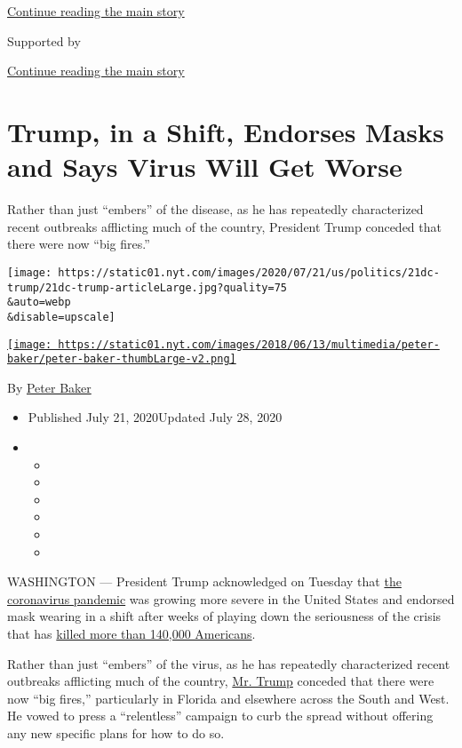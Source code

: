 \protect\hyperlink{after-top}{Continue reading the main story}

Supported by

\protect\hyperlink{after-sponsor}{Continue reading the main story}

\hypertarget{trump-in-a-shift-endorses-masks-and-says-virus-will-get-worse}{%
\section{Trump, in a Shift, Endorses Masks and Says Virus Will Get
Worse}\label{trump-in-a-shift-endorses-masks-and-says-virus-will-get-worse}}

Rather than just ``embers'' of the disease, as he has repeatedly
characterized recent outbreaks afflicting much of the country, President
Trump conceded that there were now ``big fires.''

\texttt{[image: https://static01.nyt.com/images/2020/07/21/us/politics/21dc-trump/21dc-trump-articleLarge.jpg?quality=75\\\&auto=webp\\\&disable=upscale]}

\href{https://www.nytimes.com/by/peter-baker}{\texttt{[image: https://static01.nyt.com/images/2018/06/13/multimedia/peter-baker/peter-baker-thumbLarge-v2.png]}}

By \href{https://www.nytimes.com/by/peter-baker}{Peter Baker}

\begin{itemize}
\item
  Published July 21, 2020Updated July 28, 2020
\item
  \begin{itemize}
  \item
  \item
  \item
  \item
  \item
  \item
  \end{itemize}
\end{itemize}

WASHINGTON --- President Trump acknowledged on Tuesday that
\href{https://www.nytimes.com/2020/07/21/world/coronavirus-covid-19.html}{the
coronavirus pandemic} was growing more severe in the United States and
endorsed mask wearing in a shift after weeks of playing down the
seriousness of the crisis that has
\href{https://www.nytimes.com/interactive/2020/us/coronavirus-us-cases.html}{killed
more than 140,000 Americans}.

Rather than just ``embers'' of the virus, as he has repeatedly
characterized recent outbreaks afflicting much of the country,
\href{https://www.nytimes.com/2020/07/25/us/politics/trump-florida-convention.html}{Mr.
Trump} conceded that there were now ``big fires,'' particularly in
Florida and elsewhere across the South and West. He vowed to press a
``relentless'' campaign to curb the spread without offering any new
specific plans for how to do so.

